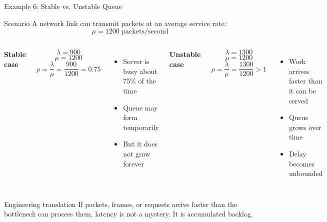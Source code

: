 \documentclass[aspectratio=169]{beamer}
\begin{document}
\begin{frame}{Example 6: Stable vs. Unstable Queue}
\tiny

\begin{block}{Scenario}
A network link can transmit packets at an average service rate:
\[
\mu = 1200 \text{ packets/second}
\]
\end{block}

\vspace{0.15cm}

\begin{columns}[T]

\textbf{Stable case}

\[
\lambda = 900
\]
\[
\mu = 1200
\]
\[
\rho = \frac{\lambda}{\mu}
= \frac{900}{1200}
= 0.75
\]

\begin{itemize}
    \item Server is busy about 75\% of the time
    \item Queue may form temporarily
    \item But it does not grow forever
\end{itemize}


\textbf{Unstable case}

\[
\lambda = 1300
\]
\[
\mu = 1200
\]
\[
\rho = \frac{\lambda}{\mu}
= \frac{1300}{1200}
> 1
\]

\begin{itemize}
    \item Work arrives faster than it can be served
    \item Queue grows over time
    \item Delay becomes unbounded
\end{itemize}

\end{columns}

\vspace{0.2cm}

\begin{alertblock}{Engineering translation}
If packets, frames, or requests arrive faster than the bottleneck can process them, latency is not a mystery. It is accumulated backlog.
\end{alertblock}

\end{frame}
\end{document}
